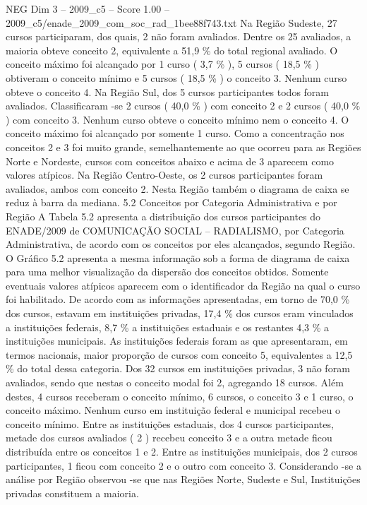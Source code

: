 \begin{textsample}{NEG Dim 3 – 2009\_c5 – Score 1.00 – 2009\_c5/enade\_2009\_com\_soc\_rad\_1bee88f743.txt}
Na Região Sudeste, 27 cursos participaram, dos quais, 2 não foram avaliados.
Dentre os 25 avaliados, a maioria obteve conceito 2, equivalente a 51,9 \% do total regional avaliado.
O conceito máximo foi alcançado por 1 curso ( 3,7 \% ), 5 cursos ( 18,5 \% ) obtiveram o conceito mínimo e 5 cursos ( 18,5 \% ) o conceito 3.
Nenhum curso obteve o conceito 4.
Na Região Sul, dos 5 cursos participantes todos foram avaliados.
Classificaram -se 2 cursos ( 40,0 \% ) com conceito 2 e 2 cursos ( 40,0 \% ) com conceito 3.
Nenhum curso obteve o conceito mínimo nem o conceito 4.
O conceito máximo foi alcançado por somente 1 curso.
Como a concentração nos conceitos 2 e 3 foi muito grande, semelhantemente ao que ocorreu para as Regiões Norte e Nordeste, cursos com conceitos abaixo e acima de 3 aparecem como valores atípicos.
Na Região Centro-Oeste, os 2 cursos participantes foram avaliados, ambos com conceito 2.
Nesta Região também o diagrama de caixa se reduz à barra da mediana. 5.2 Conceitos por Categoria Administrativa e por Região A Tabela 5.2 apresenta a distribuição dos cursos participantes do ENADE/2009 de COMUNICAÇÃO SOCIAL – RADIALISMO, por Categoria Administrativa, de acordo com os conceitos por eles alcançados, segundo Região.
O Gráfico 5.2 apresenta a mesma informação sob a forma de diagrama de caixa para uma melhor visualização da dispersão dos conceitos obtidos.
Somente eventuais valores atípicos aparecem com o identificador da Região na qual o curso foi habilitado.
De acordo com as informações apresentadas, em torno de 70,0 \% dos cursos, estavam em instituições privadas, 17,4 \% dos cursos eram vinculados a instituições federais, 8,7 \% a instituições estaduais e os restantes 4,3 \% a instituições municipais.
As instituições federais foram as que apresentaram, em termos nacionais, maior proporção de cursos com conceito 5, equivalentes a 12,5 \% do total dessa categoria.
Dos 32 cursos em instituições privadas, 3 não foram avaliados, sendo que nestas o conceito modal foi 2, agregando 18 cursos.
Além destes, 4 cursos receberam o conceito mínimo, 6 cursos, o conceito 3 e 1 curso, o conceito máximo.
Nenhum curso em instituição federal e municipal recebeu o conceito mínimo.
Entre as instituições estaduais, dos 4 cursos participantes, metade dos cursos avaliados ( 2 ) recebeu conceito 3 e a outra metade ficou distribuída entre os conceitos 1 e 2.
Entre as instituições municipais, dos 2 cursos participantes, 1 ficou com conceito 2 e o outro com conceito 3.
Considerando -se a análise por Região observou -se que nas Regiões Norte, Sudeste e Sul, Instituições privadas constituem a maioria.

\end{textsample}
